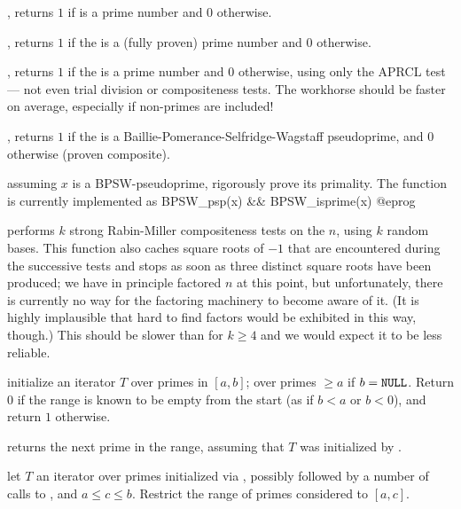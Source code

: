 
, returns $1$ if  is a prime number and
$0$ otherwise.

, returns $1$ if the   is a
(fully proven) prime number and $0$ otherwise.

, returns $1$ if the   is a
prime number and $0$ otherwise, using only the APRCL test --- not even trial
division or compositeness tests. The workhorse  should be
faster on average, especially if non-primes are included!

, returns $1$ if the   is a
Baillie-Pomerance-Selfridge-Wagstaff pseudoprime, and $0$ otherwise (proven
composite).

 assuming $x$ is a BPSW-pseudoprime, rigorously
prove its primality. The function  is currently implemented
as
\bprog
 BPSW_psp(x) && BPSW_isprime(x)
@eprog

 performs $k$ strong Rabin-Miller
compositeness tests on the  $n$, using $k$ random bases. This
function also caches square roots of $-1$ that are encountered during the
successive tests and stops as soon as three distinct square roots have been
produced; we have in principle factored $n$ at this point, but
unfortunately, there is currently no way for the factoring machinery to
become aware of it. (It is highly implausible that hard to find factors
would be exhibited in this way, though.) This should be slower than
 for $k\geq 4$ and we would expect it to be less reliable.


 initialize an
iterator $T$ over primes in $[a,b]$; over primes $\geq a$ if $b =
{\tt NULL}$. Return $0$ if the range is known to be empty from the start
(as if $b < a$ or $b < 0$), and return $1$ otherwise.

 returns the next prime in the range,
assuming that $T$ was initialized by .



 let $T$ an iterator
over primes initialized via , possibly
followed by a number of calls to , and $a \leq c \leq
b$. Restrict the range of primes considered to $[a,c]$.


